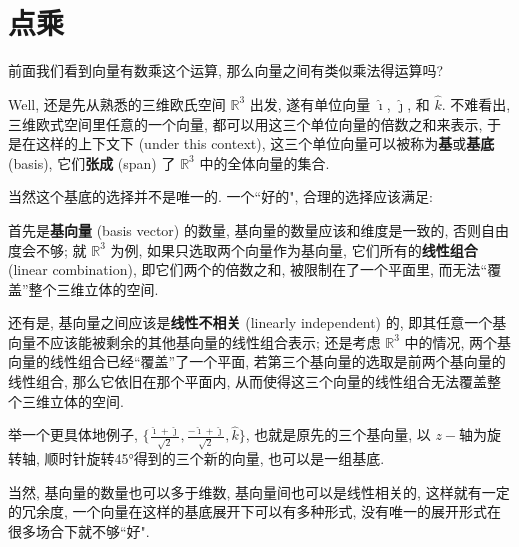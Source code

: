\section{点乘}\label{025}

前面我们看到向量有数乘这个运算, 那么向量之间有类似乘法得运算吗?

Well, 还是先从熟悉的三维欧氏空间 $\mathbb{R}^3$ 出发, 遂有单位向量
$\hat{\imath}$, $\hat{\jmath}$, 和 $\hat{k}$. 不难看出,
三维欧式空间里任意的一个向量, 都可以用这三个单位向量的倍数之和来表示,
于是在这样的上下文下 (under this context),
这三个单位向量可以被称为\textbf{基}或\textbf{基底} (basis),
它们\textbf{张成} (span) 了 $\mathbb{R}^3$ 中的全体向量的集合.

\begin{newquote}
当然这个基底的选择并不是唯一的. 一个``好的", 合理的选择应该满足:

首先是\textbf{基向量} (basis vector) 的数量,
基向量的数量应该和维度是一致的, 否则自由度会不够; 就 $\mathbb{R}^3$
为例, 如果只选取两个向量作为基向量, 它们所有的\textbf{线性组合} (linear
combination), 即它们两个的倍数之和, 被限制在了一个平面里,
而无法``覆盖''整个三维立体的空间.

还有是, 基向量之间应该是\textbf{线性不相关} (linearly
independent) 的,
即其任意一个基向量不应该能被剩余的其他基向量的线性组合表示; 还是考虑
$\mathbb{R}^3$ 中的情况, 两个基向量的线性组合已经``覆盖''了一个平面,
若第三个基向量的选取是前两个基向量的线性组合, 那么它依旧在那个平面内,
从而使得这三个向量的线性组合无法覆盖整个三维立体的空间.

举一个更具体地例子,
$\{\frac{\hat{\imath}+\hat{\jmath}}{\sqrt{2}},\frac{-\hat{\imath}+\hat{\jmath}}{\sqrt{2}},\hat{k}\}$,
也就是原先的三个基向量, 以 $z-$轴为旋转轴,
顺时针旋转45°得到的三个新的向量, 也可以是一组基底.

当然, 基向量的数量也可以多于维数, 基向量间也可以是线性相关的, 这样就有一定的冗余度, 一个向量在这样的基底展开下可以有多种形式, 没有唯一的展开形式在很多场合下就不够``好".
\end{newquote}

